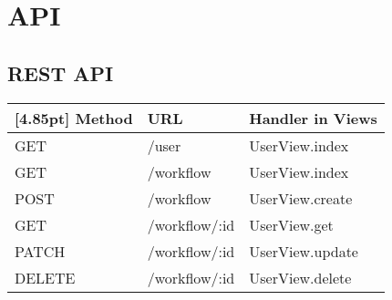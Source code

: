 \chapter{API}
    \section{REST API}
    
    \begin{center}
	    \setlength\tabcolsep{5pt}
    	\renewcommand{\arraystretch}{1.5}
        	\begin{tabularx}{\textwidth}{|l|l|X|}
        	\hline
        	\rowcolor[gray]{0.75}[4.85pt]
    		Method & URL & Handler in Views \\ \hline 
            GET & /user & UserView.index \\ \hline
            GET & /workflow & UserView.index \\ \hline
            POST & /workflow & UserView.create \\ \hline
            GET & /workflow/:id & UserView.get \\ \hline
            PATCH & /workflow/:id & UserView.update \\ \hline
            DELETE & /workflow/:id & UserView.delete \\ \hline
        	\end{tabularx}
	\end{center}